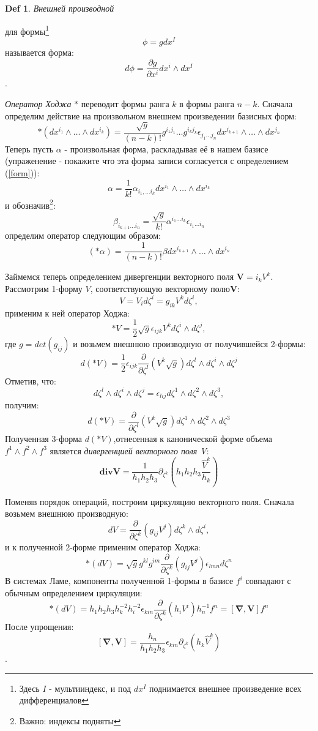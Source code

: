 \documentclass{article}
\newtheorem{defn}{Def}
\begin{document}
 	\begin{defn}Внешней производной \end{defn} для формы\footnote{Здесь $I$ - мультииндекс, и под $dx^I$ поднимается внешнее произведение всех дифференциалов}
 	$$\phi = g dx^I $$
 	называется форма:
 	$$ d\phi = \frac{\partial g}{\partial x^i} dx^i \wedge dx^I$$.
 	
 	
 	
 	\textit{Оператор Ходжа} $*$ переводит формы ранга $k$ в формы ранга $n-k$.
 	Сначала определим действие на произвольном внешнем произведении базисных форм:
 	$$* (dx^{i_1} \wedge \dots \wedge d x^{i_k}) = \frac{\sqrt{g}}{(n-k)!} g^{i_1 j_1} \dots g^{i_k j_k} \epsilon_{j_1 \dots j_n} dx^{j_{k+1}} \wedge \dots \wedge dx ^ {j_n}$$
 	Теперь пусть $\alpha$ - произвольная форма, раскладывая её в нашем базисе (упраженение - покажите что эта форма записи согласуется с определением (\ref{form})):
 	$$ \alpha = \frac{1}{k!} \alpha_{i_1, \dots i_k} dx^{i_1} \wedge \dots \wedge dx^{i_k}$$
 	и обозначив\footnote{Важно: индексы подняты}:
 	$$ \beta_{i_{k+1} \dots i_n}= \frac{\sqrt{g}}{k!} \alpha^{i_1\dots i_k} \epsilon_{i_1\dots i_n}$$
 	определим оператор следующим образом:
 	$$(*\alpha) = \frac{1}{(n-k)!} \beta dx^{i_{k+1}} \wedge \dots \wedge dx^{i_n}$$
 	
 	Займемся теперь определением дивергенции векторного поля $\mathbf{V} = i_k V^k$. Рассмотрим 1-форму $V$, соответствующую векторному полю$\mathbf{V}$:
 	$$V = V_i d \zeta^i = g_{ik} V^k d \zeta^i,$$
 	применим к ней оператор Ходжа:
 	$$*V = \frac{1}{2} \sqrt{g} \epsilon_{ijk} V^k d \zeta^i \wedge d \zeta^j,$$
 	где $g = det (g_{ij})$ и  возьмем внешнюю производную от получившейся 2-формы:
 	$$d(*V) = \frac{1}{2}  \epsilon_{ijk} \frac{\partial}{\partial \zeta^l} 
 	\left(V^k \sqrt{g}\right) d \zeta^l \wedge d \zeta^i \wedge d \zeta^j$$
 	Отметив, что:
 	$$ d\zeta^l \wedge d \zeta^i \wedge d \zeta^j = \epsilon_{lij} d \zeta^1 \wedge d \zeta^2 \wedge d \zeta^3,$$
 	получим:
 	$$d(*V) = \frac{\partial}{\partial \zeta^l} 
 	\left(V^k \sqrt{g}\right) d \zeta^1 \wedge d \zeta^2 \wedge d \zeta^3$$
 	Полученная 3-форма $d(*V)$,отнесенная к канонической форме объема $f^1 \wedge f^2 \wedge f^3$ является \textit{дивергенцией векторного поля V}:
 	$$ \mathbf{div} \mathbf{V} = \frac{1}{h_1 h_2 h_3} \partial_{\zeta^k} (h_1 h_2 h_3 \frac{\hat{V}^k}{h_k})$$ 
 	
 	Поменяв порядок операций, построим циркуляцию векторного поля. Сначала возьмем внешнюю производную:
 	$$dV = \frac{\partial}{\partial \zeta^k} \left(g_{ij} V^j\right) d \zeta^k \wedge d \zeta^i,$$
 	и к полученной 2-форме применим оператор Ходжа:
 	$$*(dV) = \sqrt{g}g^{kl}g^{im} \frac{\partial}{\partial \zeta^k} (g_{ij} V^j) \epsilon_{lmn} d \zeta^n$$
 	В системах Ламе, компоненты полученной 1-формы в базисе $f^i$ совпадают с обычным определением циркуляции:
 	$$*(dV) = h_1 h_2 h_3 h^{-2}_k h^{-2}_i \epsilon_{kin} \frac{\partial}{\partial \zeta^k} (h_i V^i) h^{-1}_n f^n = [\mathbf{\nabla}, \mathbf{V}]f^n$$
 	После упрощения:
 	$$[\mathbf{\nabla}, \mathbf{V}] = \frac{h_n}{h_1 h_2 h_3} \epsilon_{kin} \partial_{\zeta^k} (h_k \hat{V}^k)$$.
 	
\end{document}
